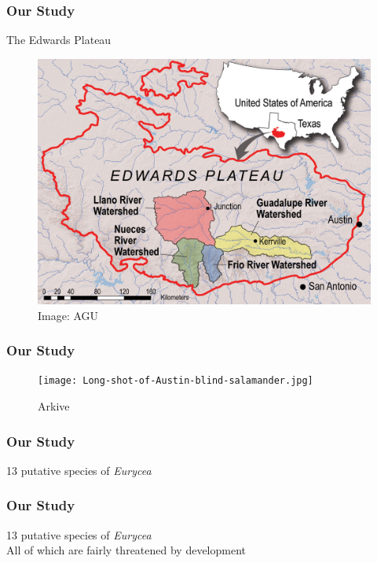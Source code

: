 \documentclass{beamer}
\begin{document}
\begin{frame}
\frametitle{Our Study}
\begin{block}{The Edwards Plateau}
\begin{figure}
    \includegraphics[scale=0.15]{pr_2010-06_map_hi-res.jpg}
    \caption{Image: AGU}
    \end{figure}
    \end{block}
\end{frame}

\begin{frame}
\frametitle{Our Study}
\begin{figure}
    \texttt{[image: Long-shot-of-Austin-blind-salamander.jpg]}
	\caption{Arkive}
    \end{figure}
\end{frame}

\begin{frame}
\frametitle{Our Study}
13 putative species of \textit{Eurycea}
\end{frame}

\begin{frame}
\frametitle{Our Study}
13 putative species of \textit{Eurycea} \\
All of which are fairly threatened by development
\end{frame}
\end{document}
